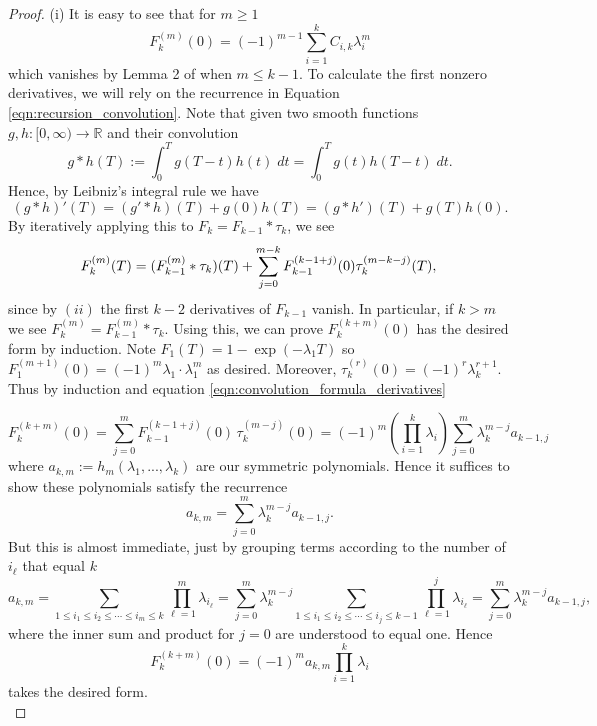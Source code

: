 \documentclass[10pt,oneside,reqno]{article}
\theoremstyle{plain}
\theoremstyle{definition}
\numberwithin{equation}{section}
\renewcommand{\cite}{\citep}
\renewcommand{\leq}{\leqslant}
\renewcommand{\geq}{\geqslant}
\newcommand{\R}{\mathbb{R}}
\begin{document}
\begin{proof}

\noindent (i) It is easy to see that for $m \geq 1$
%
\[F_k^{(m)}(0) = (-1)^{m-1}\sum_{i=1}^k C_{i,k} \lambda_i^m\]
%
which vanishes by Lemma 2 of \cite{Yanev_2020} when $m \leq k-1$. To calculate the first nonzero derivatives, we will rely on the recurrence in Equation \ref{eqn:recursion_convolution}. Note that given two smooth functions $g,h : [0, \infty) \to \R$ and their convolution
%
\[g \ast h(T) := \int_0^T g(T-t) h(t) \; dt = \int_0^T g(t) h(T-t) \; dt.\]
%
\noindent Hence, by Leibniz's integral rule we have
%
\begin{equation}
    (g \ast h)'(T) = (g' \ast h)(T) + g(0)h(T) = (g \ast h')(T) + g(T)h(0).
    \label{eqn:derivatives_of_convolutions}
\end{equation}
%
\noindent By iteratively applying this to $F_k = F_{k-1} \ast \tau_k$, we see
%
\begin{equation}
F_k^{(m)}(T) = (F_{k-1}^{(m)} \ast \tau_k)(T) + \sum_{j=0}^{m-k} F_{k-1}^{(k-1+j)}(0) \tau^{(m-k-j)}_k(T),\\
\label{eqn:convolution_formula_derivatives}
\end{equation}
%
\noindent since by $(ii)$ the first $k-2$ derivatives of $F_{k-1}$ vanish. In particular, if $k > m$ we see $F_k^{(m)} = F^{(m)}_{k-1} \ast \tau_k$. Using this, we can prove $F_{k}^{(k+m)}(0)$ has the desired form by induction. Note $F_1(T) = 1-\exp(-\lambda_1 T)$ so $F_1^{(m+1)}(0) = (-1)^{m}\lambda_1 \cdot \lambda_1^m$ as desired. Moreover, $\tau_k^{(r)}(0) = (-1)^r \lambda_k^{r+1}$. Thus by induction and equation \eqref{eqn:convolution_formula_derivatives}

\[F_{k}^{(k+m)}(0) = \sum_{j=0}^m F_{k-1}^{(k-1 + j)}(0)\,\tau^{(m-j)}_{k}(0) = (-1)^m \left(\prod_{i=1}^k \lambda_i\right) \sum_{j=0}^m \lambda_{k}^{m-j} a_{k-1, j} \]
%
\noindent where $a_{k, m} := h_m(\lambda_1,..., \lambda_k)$ are our symmetric polynomials. Hence it suffices to show these polynomials satisfy the recurrence
%
\[a_{k,m} = \sum_{j=0}^m \lambda_{k}^{m-j} a_{k-1, j}.\]
%
\noindent But this is almost immediate, just by grouping terms according to the number of $i_\ell$ that equal $k$
%
\[
a_{k,m}
= \sum_{1\leq i_1\leq i_2\leq\cdots\leq i_m\leq k}
    \prod_{\ell=1}^m \lambda_{i_\ell}
= \sum_{j=0}^m \lambda_k^{m-j}
    \sum_{1\leq i_1\leq i_2\leq\cdots\leq i_j\leq k-1}
    \prod_{\ell=1}^j \lambda_{i_\ell}
= \sum_{j=0}^m \lambda_k^{m-j} a_{k-1,j},
\]
where the inner sum and product for $j=0$ are understood to equal one.
%
\noindent Hence
%
    \[F_{k}^{(k+m)}(0) = (-1)^m a_{k,m} \prod_{i=1}^k \lambda_i\]
%
\noindent takes the desired form. \\


\end{proof}
\end{document}
